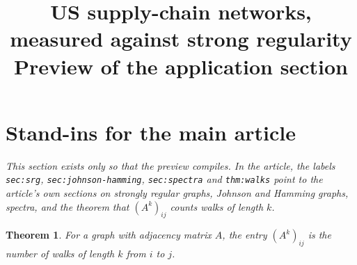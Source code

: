 \documentclass[11pt]{article}
\title{US supply-chain networks, measured against strong regularity\\
\large Preview of the application section}
\date{}
\theoremstyle{plain}
\newtheorem{theorem}{Theorem}[section]
\theoremstyle{definition}
\theoremstyle{remark}
\begin{document}
\maketitle

\section{Stand-ins for the main article}
\label{sec:srg}\label{sec:johnson-hamming}\label{sec:spectra}
{\sloppy\emph{This section exists only so that the preview compiles. In the article,
the labels \texttt{sec:srg}, \texttt{sec:johnson-hamming},
\texttt{sec:spectra} and \texttt{thm:walks} point to the article's own
sections on strongly regular graphs, Johnson and Hamming graphs, spectra, and
the theorem that $(A^k)_{ij}$ counts walks of length $k$.}\par}

\begin{theorem}\label{thm:walks}
For a graph with adjacency matrix $A$, the entry $(A^k)_{ij}$ is the number of
walks of length $k$ from $i$ to $j$.
\end{theorem}





\end{document}
